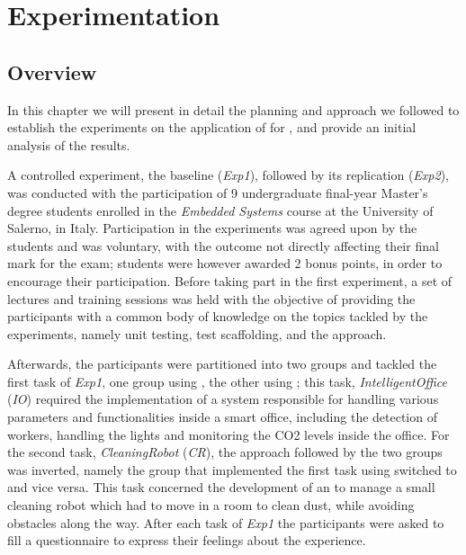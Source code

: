 \chapter{Experimentation}
\label{chap:5_approach}
\section{Overview}
In this chapter we will present in detail the planning and approach we followed to establish the experiments on the application of \tdd for \ess, and provide an initial analysis of the results.

A controlled experiment, the baseline (\textit{Exp1}), followed by its replication (\textit{Exp2}), was conducted with the participation of 9 undergraduate final-year Master's degree students enrolled in the \textit{Embedded Systems} course at the University of Salerno, in Italy. Participation in the experiments was agreed upon by the students and was voluntary, with the outcome not directly affecting their final mark for the exam; students were however awarded 2 bonus points, in order to encourage their participation.
Before taking part in the first experiment, a set of lectures and training sessions was held with the objective of providing the participants with a common body of knowledge on the topics tackled by the experiments, namely unit testing, test scaffolding, and the \tdd approach.

Afterwards, the participants were partitioned into two groups and tackled the first task of \textit{Exp1}, one group using \tdd, the other using \notdd; this task, \textit{IntelligentOffice} (\textit{IO}) required the implementation of a system responsible for handling various parameters and functionalities inside a smart office, including the detection of workers, handling the lights and monitoring the CO2 levels inside the office.
For the second task, \textit{CleaningRobot} (\textit{CR}), the approach followed by the two groups was inverted, namely the group that implemented the first task using \tdd switched to \notdd and vice versa. This task concerned the development of an \es to manage a small cleaning robot which had to move in a room to clean dust, while avoiding obstacles along the way.
After each task of \textit{Exp1} the participants were asked to fill a questionnaire to express their feelings about the experience.

